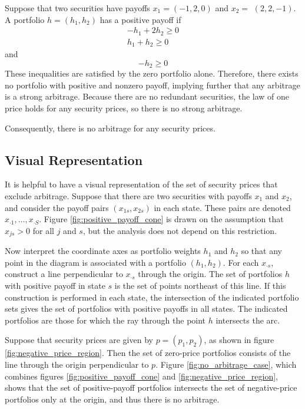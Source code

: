 \documentclass[\topdir/lecture\_notes.tex]{subfiles}
\begin{document}
\begin{example}\label{ex:no_positive_payoff}
Suppose that two securities have payoffs $x_{1}=(-1,2,0)$ and $x_{2}=$ $(2,2,-1)$. A portfolio $h=\left(h_{1}, h_{2}\right)$ has a positive payoff if
\begin{gather*}
-h_{1}+2 h_{2} \geq 0 \\
h_{1}+h_{2} \geq 0 
\end{gather*}
and
\begin{equation*}
-h_{2} \geq 0 
\end{equation*}
These inequalities are satisfied by the zero portfolio alone. Therefore, there exists no portfolio with positive and nonzero payoff, implying further that any arbitrage is a strong arbitrage. Because there are no redundant securities, the law of one price holds for any security prices, so there is no strong arbitrage. 

Consequently, there is no arbitrage for any security prices.
\end{example}

\subsection{Visual Representation}
It is helpful to have a visual representation of the set of security prices that exclude arbitrage. Suppose that there are two securities with payoffs $x_{1}$ and $x_{2}$, and consider the payoff pairs $\left(x_{1 s}, x_{2 s}\right)$ in each state. These pairs are denoted $x_{\cdot 1}, \ldots, x_{\cdot S}$. Figure \ref{fig:positive_payoff_cone} is drawn on the assumption that $x_{j s}>0$ for all $j$ and $s$, but the analysis does not depend on this restriction.

Now interpret the coordinate axes as portfolio weights $h_{1}$ and $h_{2}$ so that any point in the diagram is associated with a portfolio $\left(h_{1}, h_{2}\right)$. For each $x_{\cdot s}$, construct a line perpendicular to $x_{\cdot s}$ through the origin. The set of portfolios $h$ with positive payoff in state $s$ is the set of points northeast of this line. If this construction is performed in each state, the intersection of the indicated portfolio sets gives the set of portfolios with positive payoffs in all states. The indicated portfolios are those for which the ray through the point $h$ intersects the arc.

Suppose that security prices are given by $p=\left(p_{1}, p_{2}\right)$, as shown in figure \ref{fig:negative_price_region}. Then the set of zero-price portfolios consists of the line through the origin perpendicular to $p$. Figure \ref{fig:no_arbitrage_case}, which combines figures \ref{fig:positive_payoff_cone} and \ref{fig:negative_price_region}, shows that the set of positive-payoff portfolios intersects the set of negative-price portfolios only at the origin, and thus there is no arbitrage.
\end{document}
